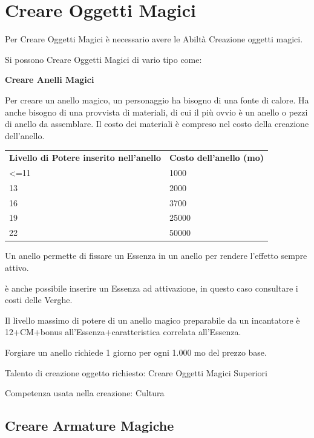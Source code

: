 \documentclass[a4paper,11pt,twoside,openany]{book}
\begin{document}
\pagebreak

\section{Creare Oggetti Magici}

\label{creare-oggetti-magici}

Per Creare Oggetti Magici è necessario avere le Abiltà Creazione oggetti magici.

Si possono Creare Oggetti Magici di vario tipo come:

\bigskip

\textbf{Creare Anelli Magici}

Per creare un anello magico, un personaggio ha bisogno di una fonte di calore. Ha anche bisogno di una provvista di materiali, di cui il più ovvio è un anello o pezzi di anello da assemblare. Il costo dei materiali è compreso nel costo della creazione dell'anello.

\bigskip

\begin{tabular}{ll}
	\toprule
	\textbf{Livello di Potere inserito nell'anello} & \textbf{Costo dell'anello (mo)}\tabularnewline
	\textless=11                                    & 1000\tabularnewline
	13                                              & 2000\tabularnewline
	16                                              & 3700\tabularnewline
	19                                              & 25000\tabularnewline
	22                                              & 50000\tabularnewline
\end{tabular}

\bigskip

Un anello permette di fissare un Essenza in un anello per rendere l'effetto sempre attivo.

è anche possibile inserire un Essenza ad attivazione, in questo caso consultare i costi delle Verghe.

Il livello massimo di potere di un anello magico preparabile da un incantatore è 12+CM+bonus all'Essenza+caratteristica correlata all'Essenza.

Forgiare un anello richiede 1 giorno per ogni 1.000 mo del prezzo base.

Talento di creazione oggetto richiesto: Creare Oggetti Magici Superiori

Competenza usata nella creazione: Cultura

\subsection{Creare Armature Magiche}
\end{document}
